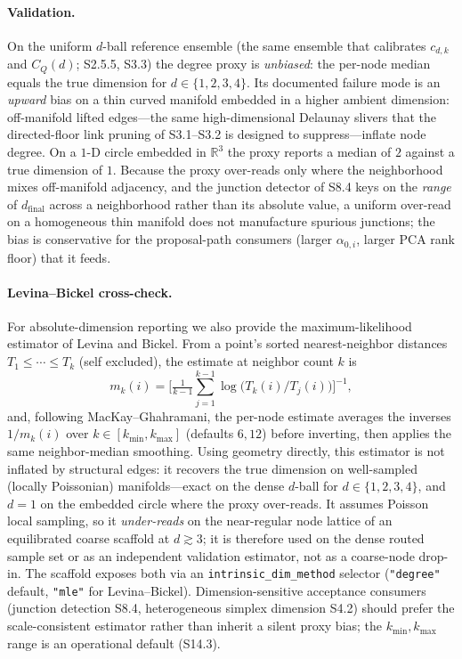 \documentclass[11pt]{article}
\begin{document}
\paragraph{Validation.}
On the uniform $d$-ball reference ensemble (the same ensemble that calibrates
$c_{d,k}$ and $C_Q(d)$; S2.5.5, S3.3) the degree proxy is \emph{unbiased}: the
per-node median equals the true dimension for $d\in\{1,2,3,4\}$. Its documented
failure mode is an \emph{upward} bias on a thin curved manifold embedded in a
higher ambient dimension: off-manifold lifted edges---the same high-dimensional
Delaunay slivers that the directed-floor link pruning of S3.1--S3.2 is designed
to suppress---inflate node degree. On a $1$-D circle embedded in $\mathbb R^3$
the proxy reports a median of $2$ against a true dimension of $1$. Because the
proxy over-reads only where the neighborhood mixes off-manifold adjacency, and
the junction detector of S8.4 keys on the \emph{range} of $d_{\mathrm{final}}$
across a neighborhood rather than its absolute value, a uniform over-read on a
homogeneous thin manifold does not manufacture spurious junctions; the bias is
conservative for the proposal-path consumers (larger $\alpha_{0,i}$, larger PCA
rank floor) that it feeds.

\paragraph{Levina--Bickel cross-check.}
For absolute-dimension reporting we also provide the maximum-likelihood
estimator of Levina and Bickel. From a point's sorted nearest-neighbor
distances $T_1\le\cdots\le T_k$ (self excluded), the estimate at neighbor count
$k$ is
\[
m_k(i)=\Big[\tfrac{1}{k-1}\textstyle\sum_{j=1}^{k-1}\log\!\big(T_k(i)/T_j(i)\big)\Big]^{-1},
\]
and, following MacKay--Ghahramani, the per-node estimate averages the inverses
$1/m_k(i)$ over $k\in[k_{\min},k_{\max}]$ (defaults $6,12$) before inverting,
then applies the same neighbor-median smoothing. Using geometry directly, this
estimator is not inflated by structural edges: it recovers the true dimension
on well-sampled (locally Poissonian) manifolds---exact on the dense $d$-ball for
$d\in\{1,2,3,4\}$, and $d=1$ on the embedded circle where the proxy over-reads.
It assumes Poisson local sampling, so it \emph{under-reads} on the near-regular
node lattice of an equilibrated coarse scaffold at $d\gtrsim3$; it is therefore
used on the dense routed sample set or as an independent validation estimator,
not as a coarse-node drop-in. The scaffold exposes both via an
\texttt{intrinsic\_dim\_method} selector (\texttt{"degree"} default,
\texttt{"mle"} for Levina--Bickel). Dimension-sensitive acceptance consumers
(junction detection S8.4, heterogeneous simplex dimension S4.2) should prefer
the scale-consistent estimator rather than inherit a silent proxy bias; the
$k_{\min},k_{\max}$ range is an operational default (S14.3).
\end{document}
